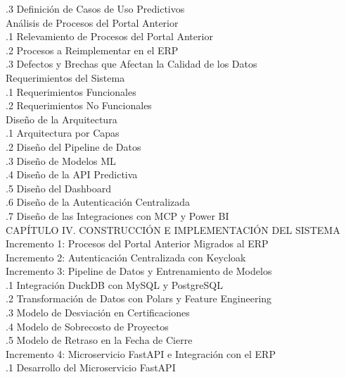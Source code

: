 \documentclass{univalle-perfil}
\begin{document}
\begin{indicetentativo}
\quad{}.3 Definición de Casos de Uso Predictivos \\
 Análisis de Procesos del Portal Anterior \\
\quad{}.1 Relevamiento de Procesos del Portal Anterior \\
\quad{}.2 Procesos a Reimplementar en el ERP \\
\quad{}.3 Defectos y Brechas que Afectan la Calidad de los Datos \\
 Requerimientos del Sistema \\
\quad{}.1 Requerimientos Funcionales \\
\quad{}.2 Requerimientos No Funcionales \\
 Diseño de la Arquitectura \\
\quad{}.1 Arquitectura por Capas \\
\quad{}.2 Diseño del Pipeline de Datos \\
\quad{}.3 Diseño de Modelos ML \\
\quad{}.4 Diseño de la API Predictiva \\
\quad{}.5 Diseño del Dashboard \\
\quad{}.6 Diseño de la Autenticación Centralizada \\
\quad{}.7 Diseño de las Integraciones con MCP y Power BI \\[2pt]
CAPÍTULO IV. CONSTRUCCIÓN E IMPLEMENTACIÓN DEL SISTEMA \\
 Incremento 1: Procesos del Portal Anterior Migrados al ERP \\
 Incremento 2: Autenticación Centralizada con Keycloak \\
 Incremento 3: Pipeline de Datos y Entrenamiento de Modelos \\
\quad{}.1 Integración DuckDB con MySQL y PostgreSQL \\
\quad{}.2 Transformación de Datos con Polars y Feature Engineering \\
\quad{}.3 Modelo de Desviación en Certificaciones \\
\quad{}.4 Modelo de Sobrecosto de Proyectos \\
\quad{}.5 Modelo de Retraso en la Fecha de Cierre \\
 Incremento 4: Microservicio FastAPI e Integración con el ERP \\
\quad{}.1 Desarrollo del Microservicio FastAPI \\

\end{indicetentativo}
\end{document}
